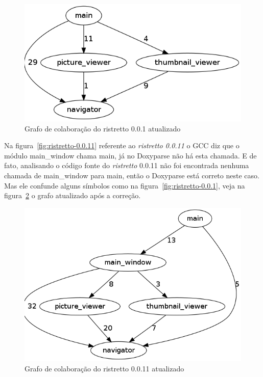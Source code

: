 \begin{figure}[h]
\center
\includegraphics[scale=0.3]{imagens/ristretto-0_0_1-doxyparse-2}
\caption{Grafo de colaboração do ristretto 0.0.1 atualizado}
\label{fig:ristretto-0.0.1-doxyparse-2}
\end{figure}

Na figura~\ref{fig:ristretto-0.0.11} referente ao {\it ristretto 0.0.11} o GCC
diz que o módulo main\_window chama main, já no Doxyparse não há esta chamada.
E de fato, analisando o código fonte do {\it ristretto} 0.0.11 não foi
encontrada nenhuma chamada de main\_window para main, então o Doxyparse está
correto neste caso. Mas ele confunde alguns símbolos como na
figura~\ref{fig:ristretto-0.0.1}, veja na
figura~\ref{fig:ristretto-0.0.11-doxyparse-2} o grafo atualizado após a
correção.

\begin{figure}
\center
\includegraphics[scale=0.3]{imagens/ristretto-0_0_11-doxyparse-2}
\caption{Grafo de colaboração do ristretto 0.0.11 atualizado}
\label{fig:ristretto-0.0.11-doxyparse-2}
\end{figure}

